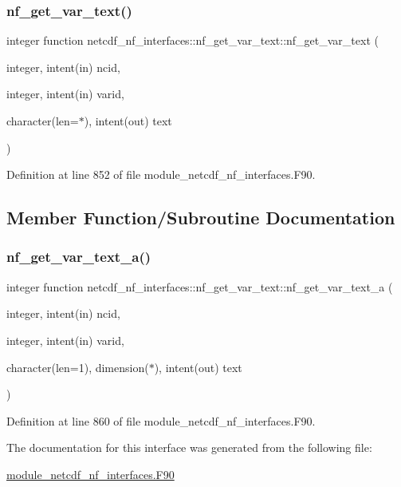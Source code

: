 \subsubsection{\texorpdfstring{nf\+\_\+get\+\_\+var\+\_\+text()}{nf\_get\_var\_text()}}
{\footnotesize\ttfamily integer function netcdf\+\_\+nf\+\_\+interfaces\+::nf\+\_\+get\+\_\+var\+\_\+text\+::nf\+\_\+get\+\_\+var\+\_\+text (\begin{DoxyParamCaption}\item[{integer, intent(in)}]{ncid,  }\item[{integer, intent(in)}]{varid,  }\item[{character(len=$\ast$), intent(out)}]{text }\end{DoxyParamCaption})}



Definition at line 852 of file module\+\_\+netcdf\+\_\+nf\+\_\+interfaces.\+F90.



\subsection{Member Function/\+Subroutine Documentation}
\mbox{\label{interfacenetcdf__nf__interfaces_1_1nf__get__var__text_ad9ea4a241f2463b554365a0d74b1a056}} 
\subsubsection{\texorpdfstring{nf\+\_\+get\+\_\+var\+\_\+text\+\_\+a()}{nf\_get\_var\_text\_a()}}
{\footnotesize\ttfamily integer function netcdf\+\_\+nf\+\_\+interfaces\+::nf\+\_\+get\+\_\+var\+\_\+text\+::nf\+\_\+get\+\_\+var\+\_\+text\+\_\+a (\begin{DoxyParamCaption}\item[{integer, intent(in)}]{ncid,  }\item[{integer, intent(in)}]{varid,  }\item[{character(len=1), dimension($\ast$), intent(out)}]{text }\end{DoxyParamCaption})}



Definition at line 860 of file module\+\_\+netcdf\+\_\+nf\+\_\+interfaces.\+F90.



The documentation for this interface was generated from the following file\+:\begin{DoxyCompactItemize}
\item 
\hyperlink{module__netcdf__nf__interfaces_8F90}{module\+\_\+netcdf\+\_\+nf\+\_\+interfaces.\+F90}\end{DoxyCompactItemize}

